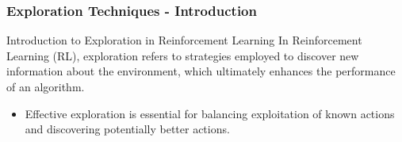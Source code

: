 \documentclass[aspectratio=169]{beamer}
\begin{document}
\begin{frame}[fragile]
    \frametitle{Exploration Techniques - Introduction}
    \begin{block}{Introduction to Exploration in Reinforcement Learning}
        In Reinforcement Learning (RL), exploration refers to strategies employed to discover new information about the environment, which ultimately enhances the performance of an algorithm. 
    \end{block}
    \begin{itemize}
        \item Effective exploration is essential for balancing exploitation of known actions and discovering potentially better actions.
    \end{itemize}
\end{frame}
\end{document}
